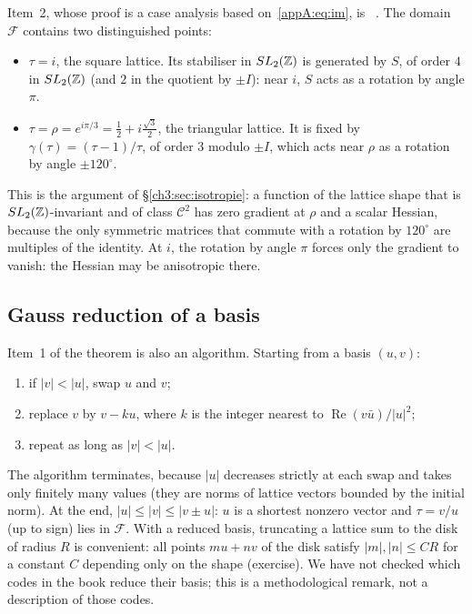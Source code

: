 Item~2, whose proof is a case analysis based on~\eqref{appA:eq:im}, is \tierL~\cite{app:serre}.
The domain $\mathcal F$ contains two distinguished points:
\begin{itemize}
\item $\tau=i$, the square lattice. Its stabiliser in $SL_2(\mathbb{Z})$ is generated by $S$, of order $4$ in $SL_2(\mathbb{Z})$
(and $2$ in the quotient by $\pm I$): near $i$, $S$ acts as a rotation by angle $\pi$.
\item $\tau=\rho=e^{i\pi/3}=\frac12+i\frac{\sqrt3}2$, the triangular lattice. It is fixed by
$\gamma(\tau)=(\tau-1)/\tau$, of order $3$ modulo $\pm I$, which acts near $\rho$ as a rotation by angle
$\pm120^\circ$.
\end{itemize}
This is the argument of §\ref{ch3:sec:isotropie}: a function of the lattice shape that is $SL_2(\mathbb{Z})$-invariant and of
class $\mathcal C^2$ has zero gradient at $\rho$ and a scalar Hessian, because the only symmetric matrices that
commute with a rotation by $120^\circ$ are multiples of the identity. At $i$, the rotation by angle $\pi$ forces only
the gradient to vanish: the Hessian may be anisotropic there.

\subsection{Gauss reduction of a basis}
Item~1 of the theorem is also an algorithm. Starting from a basis $(u,v)$:
\begin{enumerate}
\item if $|v|<|u|$, swap $u$ and $v$;
\item replace $v$ by $v-ku$, where $k$ is the integer nearest to $\operatorname{Re}(v\bar u)/|u|^2$;
\item repeat as long as $|v|<|u|$.
\end{enumerate}
The algorithm terminates, because $|u|$ decreases strictly at each swap and takes only finitely many values (they are
norms of lattice vectors bounded by the initial norm). At the end, $|u|\le|v|\le|v\pm u|$: $u$ is a shortest
nonzero vector and $\tau=v/u$ (up to sign) lies in $\mathcal F$. With a reduced basis, truncating a lattice sum to the
disk of radius $R$ is convenient: all points $mu+nv$ of the disk satisfy $|m|,|n|\le CR$ for a constant $C$ depending
only on the shape (exercise). We have not checked which codes in the book reduce their basis; this is a methodological
remark, not a description of those codes.

